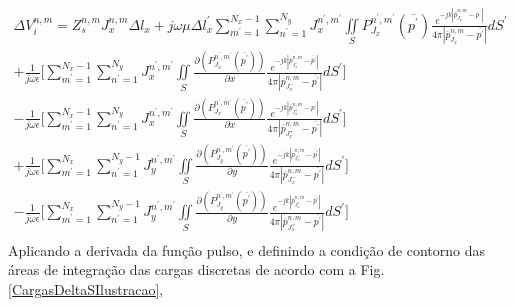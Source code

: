 \documentclass[
	12pt,				%
	openright,			%
	oneside,			%
	a4papey79r,			%
	english,			%
	brazil				%
	]{abntex2}
\begin{document}
\begin{equation}
\begin{aligned}
      \Delta V_i^{n,m}=Z_s^{n,m}  J_{x}^{n,m} {\Delta l}_x
      +
j\omega \mu  {\Delta l}^{{'}}_x \sum_{m^{'}=1}^{N_x-1}\sum_{n^{'}=1}^{N_y} J_{x}^{n^{'},m^{'}} \iint\limits_{S}  P_{J_x}^{n^{'},m^{'}}(\overline{p^{'}})   \frac{e^{-j k |\overline{p}_{{J_x}}^{n,m}-\overline{p^{'}}|}}{4 \pi |\overline{p}_{{J_x}}^{n,m}-\overline{p^{'}}|} dS^{'}    \\
+
    \frac{1}{j\omega \epsilon}\biggl[\sum_{m^{'}=1}^{N_x-1}\sum_{n^{'}=1}^{N_y} J_{x}^{n^{'},m^{'}} \iint\limits_{S}  \frac{\partial (P_{J_x}^{n^{'},m^{'}}(\overline{p^{'}})    )}{\partial x}  \frac{e^{-j k |\overline{p}_{{J_x^{-}}}^{n,m}-\overline{p^{'}}|}}{4 \pi |\overline{p}_{{J_x^{-}}}^{n,m}-\overline{p^{'}}|} dS^{'}  \biggl] \\
    -
      \frac{1}{j\omega \epsilon}\biggl[ \sum_{m^{'}=1}^{N_x-1}\sum_{n^{'}=1}^{N_y} J_{x}^{n^{'},m^{'}} \iint\limits_{S}  \frac{\partial (P_{J_x}^{n^{'},m^{'}}(\overline{p^{'}})    )}{\partial x} \frac{e^{-j k |\overline{p}_{{J_x^{+}}}^{n,m}-\overline{p^{'}}|}}{4 \pi |\overline{p}_{{J_x^{+}}}^{n,m}-\overline{p^{'}}|}dS^{'}  \biggl] \\
  +    
       \frac{1}{j\omega \epsilon}\biggl[\sum_{m^{'}=1}^{N_x}\sum_{n^{'}=1}^{N_y-1} J_{y}^{n^{'},m^{'}} \iint\limits_{S}  \frac{\partial (P_{J_y}^{n^{'},m^{'}}(\overline{p^{'}})    )}{\partial y}  \frac{e^{-j k |\overline{p}_{{J_x^{-}}}^{n,m}-\overline{p^{'}}|}}{4 \pi |\overline{p}_{{J_x^{-}}}^{n,m}-\overline{p^{'}}|} dS^{'}  \biggl] \\
    -
      \frac{1}{j\omega \epsilon}\biggl[ \sum_{m^{'}=1}^{N_x}\sum_{n^{'}=1}^{N_y-1} J_{y}^{n^{'},m^{'}} \iint\limits_{S}  \frac{\partial (P_{J_y}^{n^{'},m^{'}}(\overline{p^{'}})    )}{\partial y} \frac{e^{-j k |\overline{p}_{{J_x^{+}}}^{n,m}-\overline{p^{'}}|}}{4 \pi |\overline{p}_{{J_x^{+}}}^{n,m}-\overline{p^{'}}|}dS^{'}  \biggl] \\
\end{aligned}
\end{equation}
Aplicando a derivada da função pulso, e definindo a condição de contorno das áreas de integração das cargas discretas de acordo com a Fig. \ref{CargasDeltaSIlustracao},
\end{document}

